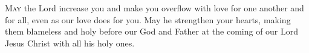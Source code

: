 
\lettrine{M}{ay} the Lord increase you and make you overflow with love for one another and for all, even as our love does for you. May he strengthen your hearts, making them blameless and holy before our God and Father at the coming of our Lord Jesus Christ with all his holy ones.